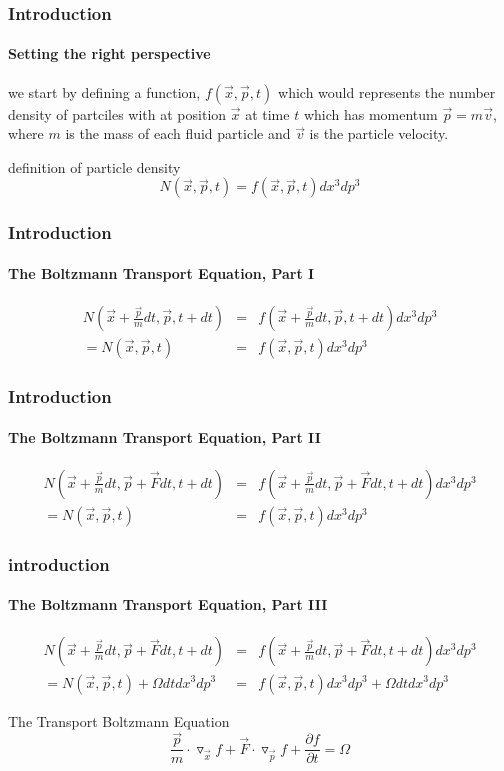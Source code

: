 \documentclass[12pt]{beamer}
\begin{document}
\begin{frame}
  \frametitle{Introduction}
  \framesubtitle{Setting the right perspective}  
   
  we start by defining a function, $f(\vec{x},\vec{p},t)$ which would represents the number 
  density of partciles with at position $\vec{x}$ at time $t$ which has momentum $\vec{p} = m\vec{v}$,
  where $m$ is the mass of each fluid particle and $\vec{v}$ is the particle velocity.
  \begin{example}{definition of particle density}
  \begin{equation}
    N(\vec{x},\vec{p},t)=f(\vec{x},\vec{p},t)dx^3dp^3
  \end{equation} 
  \end{example} 
\end{frame}


\begin{frame}
  \frametitle{Introduction}
  \framesubtitle{The Boltzmann Transport Equation, Part I}
  \begin{eqnarray} \nonumber
    N(\vec{x}+\frac{\vec{p}}{m}dt,\vec{p},t+dt) &=& f(\vec{x}+\frac{\vec{p}}{m}dt,\vec{p},t+dt)dx^3dp^3 \\
    = N(\vec{x},\vec{p},t) &=& f(\vec{x},\vec{p},t)dx^3dp^3 \nonumber
  \end{eqnarray}
\end{frame}

\begin{frame}
  \frametitle{Introduction}
  \framesubtitle{The Boltzmann Transport Equation, Part II}
  \begin{eqnarray} \nonumber
    N(\vec{x}+\frac{\vec{p}}{m}dt,\vec{p}+\vec{F}dt,t+dt) &=& f(\vec{x}+\frac{\vec{p}}{m}dt,\vec{p}+\vec{F}dt,t+dt)dx^3dp^3 \\
    = N(\vec{x},\vec{p}, t) &=& f(\vec{x},\vec{p},t)dx^3dp^3 \nonumber
  \end{eqnarray}
\end{frame}

\begin{frame}
  \frametitle{introduction}
  \framesubtitle{The Boltzmann Transport Equation, Part III}
  \begin{eqnarray} \nonumber
    N(\vec{x}+\frac{\vec{p}}{m}dt,\vec{p}+\vec{F}dt,t+dt) &=& f(\vec{x}+\frac{\vec{p}}{m}dt,\vec{p}+\vec{F}dt,t+dt)dx^3dp^3 \\
    = N(\vec{x},\vec{p},t)+\Omega dtdx^3dp^3 &=& f(\vec{x},\vec{p},t)dx^3dp^3+\Omega dtdx^3dp^3 \nonumber
  \end{eqnarray}
  \begin{block}{The Transport Boltzmann Equation}
  \begin{equation}
   \frac{\vec{p}}{m}\cdot \triangledown_{\vec{x}}f+\vec{F}\cdot \triangledown_{\vec{p}}f+\frac{\partial f}{\partial t}=\Omega
  \end{equation} 
  \label{Transport Boltzmann Equation}
  \end{block}
\end{frame} 
\end{document}
